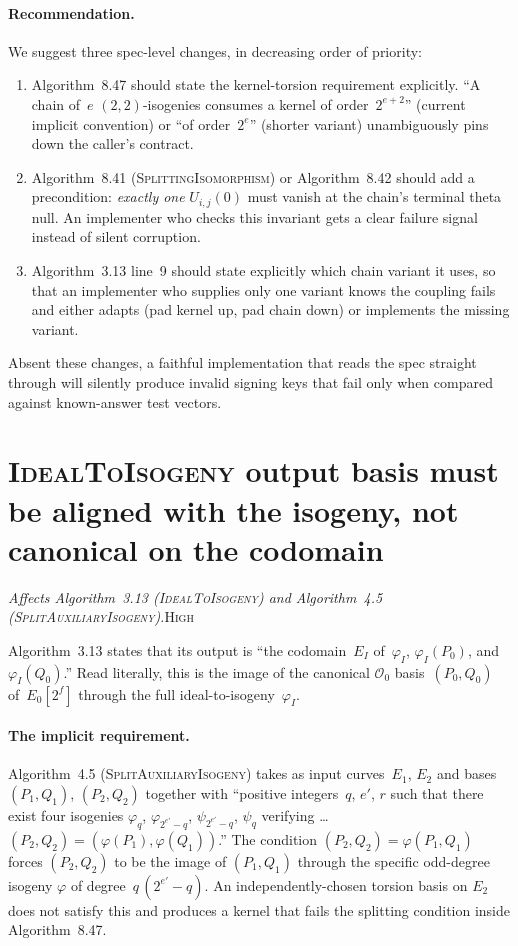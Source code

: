 \documentclass[a4paper,11pt]{article}
\newcommand{\algo}[1]{Algorithm~#1}
\newcommand{\high}{\textsc{\color{BurntOrange}High}}
\newcommand{\finding}[2]{\noindent\textit{#1}\hfill#2\par\smallskip}
\begin{document}
\paragraph{Recommendation.}
We suggest three spec-level changes, in decreasing order of
priority:
\begin{enumerate}
  \item \algo{8.47} should state the kernel-torsion requirement
    explicitly.  ``A chain of~$e$ $(2,2)$-isogenies consumes a
    kernel of order~$2^{e+2}$'' (current implicit convention) or
    ``of order~$2^e$'' (shorter variant)
    unambiguously pins down the caller's contract.
  \item \algo{8.41} (\textsc{SplittingIsomorphism}) or
    \algo{8.42} should add a precondition:
    \emph{exactly one} $U_{i,j}(0)$ must vanish at the chain's
    terminal theta null.  An implementer who checks this
    invariant gets a clear failure signal instead of silent
    corruption.
  \item \algo{3.13} line~9 should state explicitly which chain
    variant it uses, so that an implementer who supplies only
    one variant knows the coupling fails and either adapts
    (pad kernel up, pad chain down) or implements the
    missing variant.
\end{enumerate}
Absent these changes, a faithful implementation that reads the
spec straight through will silently produce invalid signing keys
that fail only when compared against known-answer test vectors.

\section{\textsc{IdealToIsogeny} output basis must be aligned with
  the isogeny, not canonical on the codomain}
\label{sec:id2iso-aligned-basis}

\finding{Affects \algo{3.13} (\textsc{IdealToIsogeny}) and
  \algo{4.5} (\textsc{SplitAuxiliaryIsogeny}).}{\high}

\algo{3.13} states that its output is ``the codomain~$E_I$
of~$\varphi_I$, $\varphi_I(P_0)$, and $\varphi_I(Q_0)$.'' Read
literally, this is the image of the canonical $\mathcal{O}_0$
basis~$(P_0, Q_0)$ of~$E_0[2^f]$ through the full
ideal-to-isogeny~$\varphi_I$.

\paragraph{The implicit requirement.} \algo{4.5}
(\textsc{SplitAuxiliaryIsogeny}) takes as input curves~$E_1$,
$E_2$ and bases~$(P_1, Q_1)$, $(P_2, Q_2)$ together with
``positive integers~$q$, $e'$, $r$ such that there exist four
isogenies $\varphi_q$, $\varphi_{2^{e'}-q}$, $\psi_{2^{e'}-q}$,
$\psi_q$ verifying \dots\ $(P_2, Q_2) = (\varphi(P_1),
\varphi(Q_1))$.''  The condition $(P_2, Q_2) = \varphi(P_1, Q_1)$
forces $(P_2, Q_2)$ to be the image of $(P_1, Q_1)$ through the
specific odd-degree isogeny $\varphi$ of degree~$q\,(2^{e'}-q)$.
An independently-chosen torsion basis on $E_2$ does not satisfy
this and produces a kernel that fails the splitting condition
inside \algo{8.47}.
\end{document}
